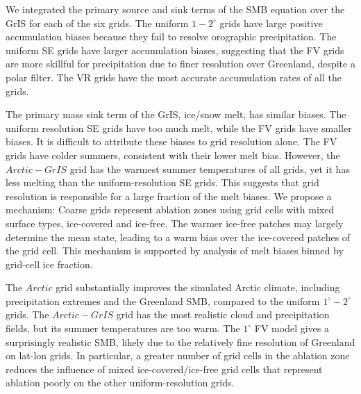 \documentclass[draft]{agujournal2019}
\begin{document}
We integrated the primary source and sink terms of the SMB equation over the GrIS for each of the six grids. The uniform $1-2^{\circ}$ grids have large positive accumulation biases because they fail to resolve orographic precipitation. The uniform SE grids have larger accumulation biases, suggesting that the FV grids are more skillful for precipitation due to finer resolution over Greenland, despite a polar filter. The VR grids have the most accurate accumulation rates of all the grids. 

The primary mass sink term of the GrIS, ice/snow melt, has similar biases. The uniform resolution SE grids have too much melt, while the FV grids have smaller biases. It is difficult to attribute these biases to grid resolution alone.  The FV grids have colder summers, consistent with their lower melt bias. However, the $Arctic-GrIS$ grid has the warmest summer temperatures of all grids, yet it has less melting than the uniform-resolution SE grids. This suggests that grid resolution is responsible for a large fraction of the melt biases. We propose a mechanism: Coarse grids represent ablation zones using grid cells with mixed surface types, ice-covered and ice-free.  The warmer ice-free patches may largely determine the mean state, leading to a warm bias over the ice-covered patches of the grid cell. This mechanism is supported by analysis of melt biases binned by grid-cell ice fraction. 

The $Arctic$ grid substantially improves the simulated Arctic climate, including precipitation extremes and the Greenland SMB, compared to the uniform $1^{\circ}-2^{\circ}$ grids. The $Arctic-GrIS$ grid has the most realistic cloud and precipitation fields, but its summer temperatures are too warm. The $1^{\circ}$ FV model gives a surprisingly realistic SMB, likely due to the relatively fine resolution of Greenland on lat-lon grids. In particular, a greater number of grid cells in the ablation zone reduces the influence of mixed ice-covered/ice-free grid cells that represent ablation poorly on the other uniform-resolution grids.
\end{document}
